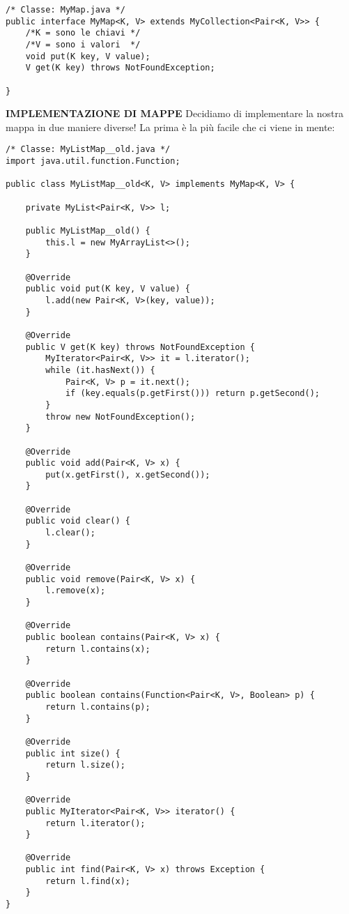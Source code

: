\begin{lstlisting}
/* Classe: MyMap.java */
public interface MyMap<K, V> extends MyCollection<Pair<K, V>> {
	/*K = sono le chiavi */
	/*V = sono i valori  */
    void put(K key, V value);
    V get(K key) throws NotFoundException;

}
\end{lstlisting}

\noindent \textbf{IMPLEMENTAZIONE DI MAPPE}\newline
\noindent Decidiamo di implementare la nostra mappa in due maniere diverse! La prima è la più facile che ci viene in mente:

\begin{lstlisting}
/* Classe: MyListMap__old.java */
import java.util.function.Function;

public class MyListMap__old<K, V> implements MyMap<K, V> {

    private MyList<Pair<K, V>> l;

    public MyListMap__old() {
        this.l = new MyArrayList<>();
    }

    @Override
    public void put(K key, V value) {
        l.add(new Pair<K, V>(key, value));
    }

    @Override
    public V get(K key) throws NotFoundException {
        MyIterator<Pair<K, V>> it = l.iterator();
        while (it.hasNext()) {
            Pair<K, V> p = it.next();
            if (key.equals(p.getFirst())) return p.getSecond();
        }
        throw new NotFoundException();
    }

    @Override
    public void add(Pair<K, V> x) {
        put(x.getFirst(), x.getSecond());
    }

    @Override
    public void clear() {
        l.clear();
    }

    @Override
    public void remove(Pair<K, V> x) {
        l.remove(x);
    }

    @Override
    public boolean contains(Pair<K, V> x) {
        return l.contains(x);
    }

    @Override
    public boolean contains(Function<Pair<K, V>, Boolean> p) {
        return l.contains(p);
    }

    @Override
    public int size() {
        return l.size();
    }

    @Override
    public MyIterator<Pair<K, V>> iterator() {
        return l.iterator();
    }

    @Override
    public int find(Pair<K, V> x) throws Exception {
        return l.find(x);
    }
}
\end{lstlisting}

